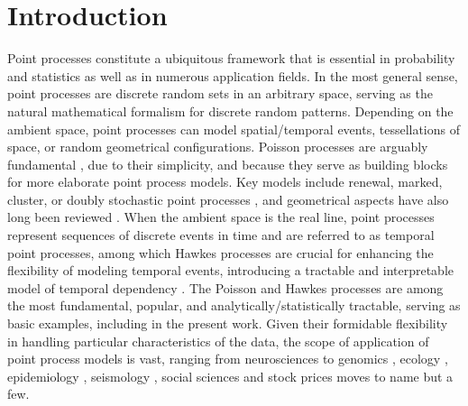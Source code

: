 \documentclass[aos]{imsart}
\theoremstyle{plain}
\theoremstyle{remark}
\newcommand{\1}{1}
\begin{document}
\begin{frontmatter}
		\begin{keyword}[class=MSC]
		\end{keyword}
		
		\begin{keyword}
		\end{keyword}
		
	\end{frontmatter}
\section{Introduction}

Point processes constitute a ubiquitous framework that is essential in probability and statistics as well as in numerous application fields. In the most general sense, point processes are discrete random sets in an arbitrary space, serving as the natural mathematical formalism for discrete random patterns. Depending on the ambient space, point processes can model spatial/temporal events, tessellations of space, or random geometrical configurations. Poisson processes are arguably fundamental \cite{Kingman}, due to their simplicity, and because they serve as building blocks for more elaborate point process models. Key models include renewal, marked, cluster, or doubly stochastic point processes \cite{DV1,DV2}, and geometrical aspects have also long been reviewed \cite{chiu2013stochastic}.  When the ambient space is the real line, point processes represent sequences of discrete events in time and are referred to as temporal point processes, among which Hawkes processes \cite{Hawkes71a, Hawkes71b} are crucial for enhancing the flexibility of modeling temporal events, introducing a tractable and interpretable model of temporal dependency \cite{BM1, BM2}. The Poisson and Hawkes processes are among the most fundamental, popular, and analytically/statistically tractable, serving as basic examples, including in the present work. Given their formidable flexibility in handling particular characteristics of the data, the scope of application of point process models is vast, ranging from neurosciences \cite{MR961117, JMM, BONNET2022109550} to genomics \cite{carstensen2010multivariate,gusto:hal-02682109}, ecology \cite{ward2022network}, epidemiology \cite{CHIANG2022505}, seismology  \cite{ogata1988statistical}, social sciences \cite{mohler2011self,farajtabar2016coevolve, crane2008robust} and stock prices moves \cite{Embrechts} 
to name but a few. 
\end{document}
